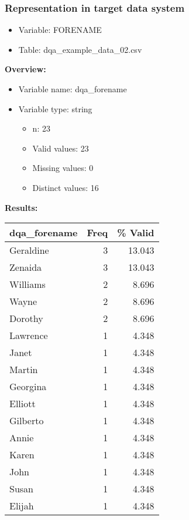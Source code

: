 \documentclass[
]{article}
\providecommand{\tightlist}{%
  \setlength{\itemsep}{0pt}\setlength{\parskip}{0pt}}
\begin{document}
\hypertarget{representation-in-target-data-system-6}{%
\subsubsection{\texorpdfstring{Representation in \textbf{target} data
system}{Representation in target data system}}\label{representation-in-target-data-system-6}}

\begin{itemize}
\tightlist
\item
  Variable: FORENAME
\item
  Table: dqa\_example\_data\_02.csv
\end{itemize}

\textbf{Overview:}

\begin{itemize}
\tightlist
\item
  Variable name: dqa\_forename
\item
  Variable type: string

  \begin{itemize}
  \tightlist
  \item
    n: 23
  \item
    Valid values: 23
  \item
    Missing values: 0
  \item
    Distinct values: 16
  \end{itemize}
\end{itemize}

\textbf{Results:}\\

\begin{table}[H]
\centering
\begin{tabular}{l|r|r}
\hline
\textbf{dqa\_forename} & \textbf{Freq} & \textbf{\% Valid}\\
\hline
Geraldine & 3 & 13.043\\
\hline
Zenaida & 3 & 13.043\\
\hline
Williams & 2 & 8.696\\
\hline
Wayne & 2 & 8.696\\
\hline
Dorothy & 2 & 8.696\\
\hline
Lawrence & 1 & 4.348\\
\hline
Janet & 1 & 4.348\\
\hline
Martin & 1 & 4.348\\
\hline
Georgina & 1 & 4.348\\
\hline
Elliott & 1 & 4.348\\
\hline
Gilberto & 1 & 4.348\\
\hline
Annie & 1 & 4.348\\
\hline
Karen & 1 & 4.348\\
\hline
John & 1 & 4.348\\
\hline
Susan & 1 & 4.348\\
\hline
Elijah & 1 & 4.348\\
\hline
\end{tabular}
\end{table}
\newpage
\end{document}
